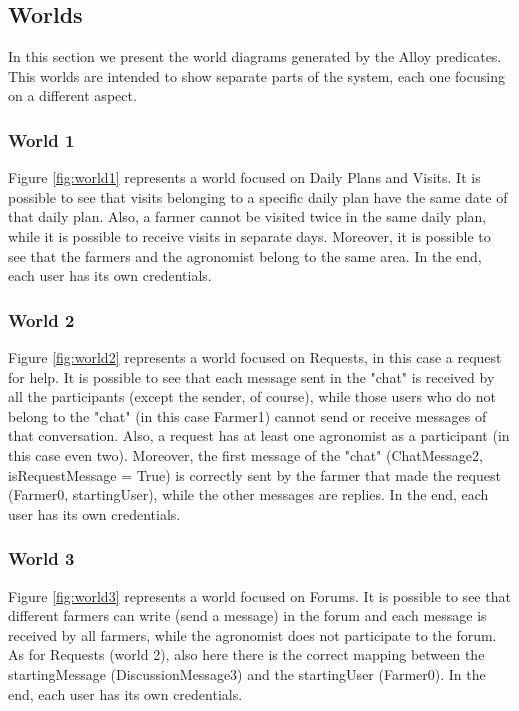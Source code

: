 \newpage

\subsection{Worlds}

In this section we present the world diagrams generated by the Alloy predicates. This worlds are intended to show separate parts of the system, each one focusing on a different aspect.

\subsubsection*{World 1}
Figure \ref{fig:world1} represents a world focused on Daily Plans and Visits. It is possible to see that visits belonging to a specific daily plan have the same date of that daily plan. Also, a farmer cannot be visited twice in the same daily plan, while it is possible to receive visits in separate days. Moreover, it is possible to see that the farmers and the agronomist belong to the same area. In the end, each user has its own credentials.

\subsubsection*{World 2}
Figure \ref{fig:world2} represents a world focused on Requests, in this case a request for help. It is possible to see that each message sent in the "chat" is received by all the participants (except the sender, of course), while those users who do not belong to the "chat" (in this case Farmer1) cannot send or receive messages of that conversation. Also, a request has at least one agronomist as a participant (in this case even two). Moreover, the first message of the "chat" (ChatMessage2, isRequestMessage = True) is correctly sent by the farmer that made the request (Farmer0, startingUser), while the other messages are replies. In the end, each user has its own credentials.

\subsubsection*{World 3}
Figure \ref{fig:world3} represents a world focused on Forums. It is possible to see that different farmers can write (send a message) in the forum and each message is received by all farmers, while the agronomist does not participate to the forum. As for Requests (world 2), also here there is the correct mapping between the startingMessage (DiscussionMessage3) and the startingUser (Farmer0). In the end, each user has its own credentials.

